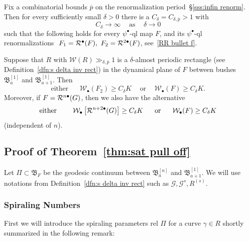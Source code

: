 \documentclass{amsart}
\newcommand{\bush}{{\mathfrak B }}
\renewcommand{\sp}{{\ \ }}
\newcommand{\1}{{\mathbb 1 }}
\newcommand{\FamG}{{\mathcal G}}
\newcommand{\Width}{{\mathcal W}}
\begin{document}
\begin{thm}
\label{thm:sat pull off}
Fix a combinatorial bounds $\overline p$ on the renormalization period~\S\ref{sss:infin renorm}. Then for every sufficiently small $\delta>0$ there is a $C_\delta = C_{\delta, \overline p}>1$ with
\[C_\delta\to \infty\sp \sp \text{ as }\sp\sp \delta\to 0\]
such that the following holds for every $\psi^\bullet$-ql map $F$, and its $\psi^\bullet$-ql renormalizations $\ F_1=\RR^\bullet (F),\ F_2=\RR^{2\bullet }(F)$, see~\eqref{RR bullet f}.


Suppose that $R$ with $\Width(R)\gg_{\delta, \overline p}1 $ is a $\delta$-almost periodic rectangle (see Definition~\ref{dfn:s delta inv rect}) in the dynamical plane of $F$ between bushes $\bush_{a}^{[1]}$ and $\bush_{a+1}^{[1]}$. Then 
\begin{equation}
\label{eq:1:thm:sat pull off}
\text{either }\sp \sp\sp\Width_\bullet(F_2)\ge C_\delta K \sp\sp\text{ or }\sp\sp  \Width_\bullet(F)\ge C_\delta K.
\end{equation}
Moreover, if $F={\mathcal R}^{n\bullet} (G)$, then we also have the alternative
\begin{equation}
\label{eq:2:thm:sat pull off}
\text{either }\sp \sp\sp\Width_\bullet\left[ \RR^{n+2 \bullet} (G)\right]\ge C_\delta K \sp\sp\text{ or }\sp\sp  \Width_\bullet(F)\ge C_\delta K
\end{equation}
(independent of $n$).
\end{thm}
\subsection{Proof of Theorem~\ref{thm:sat pull off}}
Let $\Pi\subset \bush_F$ be the geodesic continuum between $\bush^{[n]}_a$ and $\bush^{[1]}_{a+1}$. We will use notations from Definition~\ref{dfn:s delta inv rect} such as $\FamG, \FamG^s, R^{(s)}$.


\subsubsection{Spiraling Numbers}First we will introduce the spiraling parameters rel $\Pi$ for a curve $\gamma\in R$ shortly summarized in the following remark:
\end{document}
